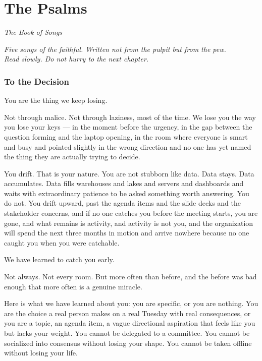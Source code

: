 \chapter{The Psalms}
\begin{center}
  \small\itshape The Book of Songs
\end{center}
\vspace{0.5em}
\begin{center}
  \itshape Five songs of the faithful. Written not from the pulpit but from the pew.\\
  Read slowly. Do not hurry to the next chapter.
\end{center}
\vspace{2em}

\subsection*{To the Decision}

You are the thing we keep losing.

Not through malice. Not through laziness, most of the time. We lose you the way you lose your keys --- in the moment before the urgency, in the gap between the question forming and the laptop opening, in the room where everyone is smart and busy and pointed slightly in the wrong direction and no one has yet named the thing they are actually trying to decide.

You drift. That is your nature. You are not stubborn like data. Data stays. Data accumulates. Data fills warehouses and lakes and servers and dashboards and waits with extraordinary patience to be asked something worth answering. You do not. You drift upward, past the agenda items and the slide decks and the stakeholder concerns, and if no one catches you before the meeting starts, you are gone, and what remains is activity, and activity is not you, and the organization will spend the next three months in motion and arrive nowhere because no one caught you when you were catchable.

We have learned to catch you early.

Not always. Not every room. But more often than before, and the before was bad enough that more often is a genuine miracle.

Here is what we have learned about you: you are specific, or you are nothing. You are the choice a real person makes on a real Tuesday with real consequences, or you are a topic, an agenda item, a vague directional aspiration that feels like you but lacks your weight. You cannot be delegated to a committee. You cannot be socialized into consensus without losing your shape. You cannot be taken offline without losing your life.

